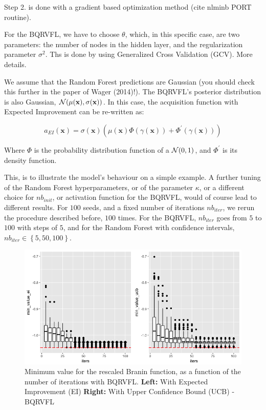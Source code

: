 Step 2. is done with a gradient based optimization method (cite nlminb PORT routine).

\medskip

For the BQRVFL, we have to choose $\theta$, which, in this specific case, are two parameters: the number of nodes in the hidden layer, and the regularization parameter $\sigma^2$. Ths is done by using Generalized Cross Validation (GCV). More details.  

\medskip

We assume that the Random Forest predictions are Gaussian (you should check this further in the paper of Wager (2014)!). The BQRVFL's posterior distribution is also Gaussian, $\mathcal{N}(\mu(\textbf{x}), \sigma(\textbf{x}))$. In this case, the acquisition function with  Expected Improvement can be re-written as: 

$$
a_{EI}(\textbf{x}) = \sigma(\textbf{x}) \left( \mu(\textbf{x}) \Phi \left( \gamma(\textbf{x}) \right) +  \Phi^{'} \left( \gamma(\textbf{x}) \right) \right)
$$

\medskip

Where $\Phi$ is the probability distribution function of a $\mathcal{N}(0, 1)$, and $\Phi^{'}$ is its density function. 

\medskip

This, is to illustrate the model's behaviour on a simple example. A further tuning of the Random Forest hyperparameters, or of the parameter $\kappa$, or a different choice for $nb_{init}$, or activation function for the BQRVFL, would of course lead to different results. For $100$ seeds, and a fixed number of iterations $nb_{iter}$, we rerun the procedure described before, $100$ times. For the BQRVFL, $nb_{iter}$ goes from $5$ to $100$ with steps of $5$, and for the Random Forest with confidence intervals, $nb_{iter} \in \left \lbrace 5, 50, 100 \right \rbrace$. 

\begin{figure}[!htb]
\centering
\includegraphics[width=13cm]{gfx/chapter-bayesianrvfl/evol_iter_ei_ucb.png}
\caption{Minimum value for the rescaled Branin function, as a function of the number of iterations with BQRVFL. 
\textbf{Left:} With Expected Improvement (EI) \textbf{Right:} With Upper Confidence Bound (UCB) - BQRVFL}
\label{min_value_dist_bqrvfl}
\end{figure}

